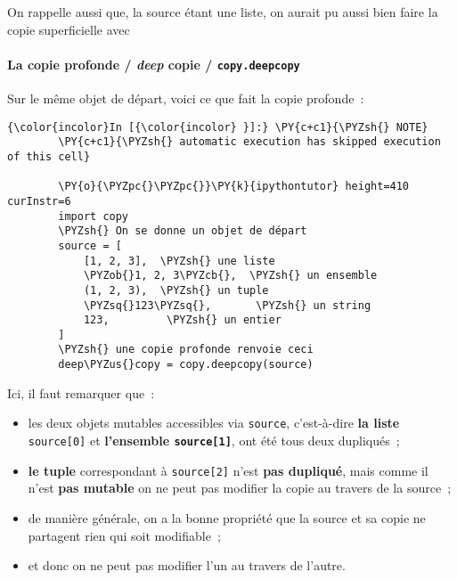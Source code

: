     On rappelle aussi que, la source étant une liste, on aurait pu aussi
bien faire la copie superficielle avec

\begin{Shaded}
\begin{Highlighting}[]
\OperatorTok{=}
\end{Highlighting}
\end{Shaded}

    \hypertarget{la-copie-profonde-deep-copie-copy.deepcopy}{%
\paragraph{\texorpdfstring{La copie profonde / \emph{deep} copie /
\texttt{copy.deepcopy}}{La copie profonde / deep copie / copy.deepcopy}}\label{la-copie-profonde-deep-copie-copy.deepcopy}}

    Sur le même objet de départ, voici ce que fait la copie profonde~:

    \begin{Verbatim}[commandchars=\\\{\}]
{\color{incolor}In [{\color{incolor} }]:} \PY{c+c1}{\PYZsh{} NOTE}
        \PY{c+c1}{\PYZsh{} automatic execution has skipped execution of this cell}
        
        \PY{o}{\PYZpc{}\PYZpc{}}\PY{k}{ipythontutor} height=410 curInstr=6
        import copy
        \PYZsh{} On se donne un objet de départ
        source = [
            [1, 2, 3],  \PYZsh{} une liste
            \PYZob{}1, 2, 3\PYZcb{},  \PYZsh{} un ensemble
            (1, 2, 3),  \PYZsh{} un tuple
            \PYZsq{}123\PYZsq{},       \PYZsh{} un string
            123,         \PYZsh{} un entier
        ]
        \PYZsh{} une copie profonde renvoie ceci
        deep\PYZus{}copy = copy.deepcopy(source)
\end{Verbatim}


    Ici, il faut remarquer que~:

\begin{itemize}
\tightlist
\item
  les deux objets mutables accessibles via \texttt{source}, c'est-à-dire
  \textbf{la liste} \texttt{source{[}0{]}} et \textbf{l'ensemble
  \texttt{source{[}1{]}}}, ont été tous deux dupliqués~;
\item
  \textbf{le tuple} correspondant à \texttt{source{[}2{]}} n'est
  \textbf{pas dupliqué}, mais comme il n'est \textbf{pas mutable} on ne
  peut pas modifier la copie au travers de la source~;
\item
  de manière générale, on a la bonne propriété que la source et sa copie
  ne partagent rien qui soit modifiable~;
\item
  et donc on ne peut pas modifier l'un au travers de l'autre.
\end{itemize}

